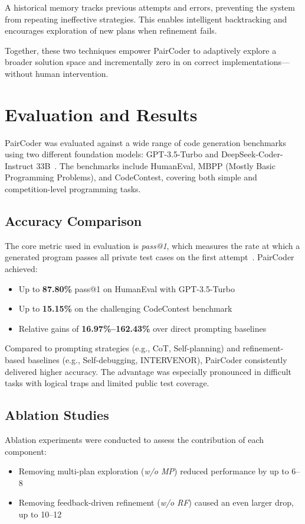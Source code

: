 \documentclass[11pt,a4paper]{article}
\begin{document}
A historical memory tracks previous attempts and errors, preventing the system from repeating ineffective strategies. This enables intelligent backtracking and encourages exploration of new plans when refinement fails.

Together, these two techniques empower PairCoder to adaptively explore a broader solution space and incrementally zero in on correct implementations—without human intervention.
\section{Evaluation and Results}
PairCoder was evaluated against a wide range of code generation benchmarks using two different foundation models: GPT-3.5-Turbo and DeepSeek-Coder-Instruct 33B~\cite{zhang2024paircoder}. The benchmarks include HumanEval, MBPP (Mostly Basic Programming Problems), and CodeContest, covering both simple and competition-level programming tasks.

\subsection{Accuracy Comparison}
The core metric used in evaluation is \textit{pass@1}, which measures the rate at which a generated program passes all private test cases on the first attempt~\cite{zhang2024paircoder}. PairCoder achieved:
\begin{itemize}
\item Up to \textbf{87.80\%} pass@1 on HumanEval with GPT-3.5-Turbo
\item Up to \textbf{15.15\%} on the challenging CodeContest benchmark
\item Relative gains of \textbf{16.97\%–162.43\%} over direct prompting baselines
\end{itemize}

Compared to prompting strategies (e.g., CoT, Self-planning) and refinement-based baselines (e.g., Self-debugging, INTERVENOR), PairCoder consistently delivered higher accuracy. The advantage was especially pronounced in difficult tasks with logical traps and limited public test coverage.

\subsection{Ablation Studies}
Ablation experiments were conducted to assess the contribution of each component:
\begin{itemize}
\item Removing multi-plan exploration (\textit{w/o MP}) reduced performance by up to 6–8%
\item Removing feedback-driven refinement (\textit{w/o RF}) caused an even larger drop, up to 10–12%
\end{itemize}
\end{document}
